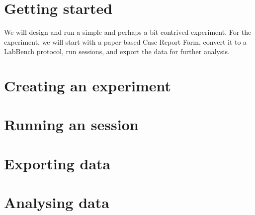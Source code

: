 \section{Getting started}

We will design and run a simple and perhaps a bit contrived experiment. For the experiment, we will start with a paper-based Case Report Form, convert it to a LabBench protocol, run sessions, and export the data for further analysis.


\section{Creating an experiment}

\section{Running an session}

\section{Exporting data}

\section{Analysing data}

